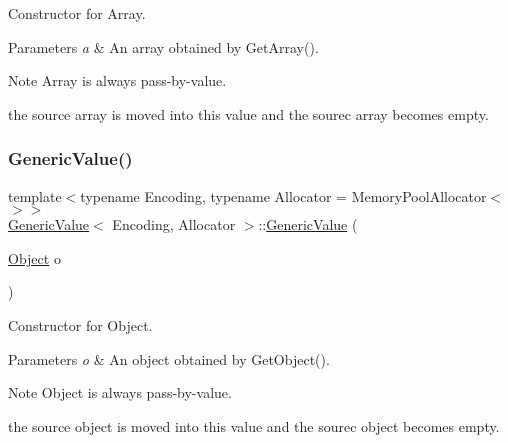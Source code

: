 Constructor for Array. 


\begin{DoxyParams}{Parameters}
{\em a} & An array obtained by {\ttfamily Get\+Array()}. \\
\hline
\end{DoxyParams}
\begin{DoxyNote}{Note}
{\ttfamily Array} is always pass-\/by-\/value. 

the source array is moved into this value and the sourec array becomes empty. 
\end{DoxyNote}
\mbox{\label{class_generic_value_a9c294e56f4ab940f845f7c171b183483}} 
\subsubsection{\texorpdfstring{Generic\+Value()}{GenericValue()}\hspace{0.1cm}{\footnotesize\ttfamily [5/5]}}
{\footnotesize\ttfamily template$<$typename Encoding, typename Allocator = Memory\+Pool\+Allocator$<$$>$$>$ \\
\hyperlink{class_generic_value}{Generic\+Value}$<$ Encoding, Allocator $>$\+::\hyperlink{class_generic_value}{Generic\+Value} (\begin{DoxyParamCaption}\item[{\hyperlink{class_generic_object}{Object}}]{o }\end{DoxyParamCaption})\hspace{0.3cm}{\ttfamily [inline]}}



Constructor for Object. 


\begin{DoxyParams}{Parameters}
{\em o} & An object obtained by {\ttfamily Get\+Object()}. \\
\hline
\end{DoxyParams}
\begin{DoxyNote}{Note}
{\ttfamily Object} is always pass-\/by-\/value. 

the source object is moved into this value and the sourec object becomes empty. 
\end{DoxyNote}
\mbox{\label{class_generic_value_a213ba89ef5ef961a5e655bd8c78ac9f4}} 
